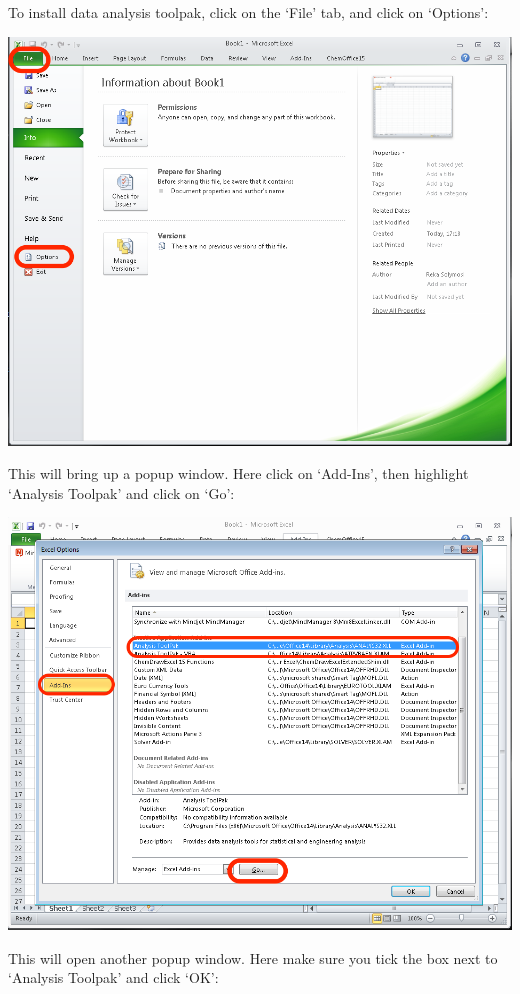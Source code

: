 \documentclass[
]{book}
\begin{document}
To install data analysis toolpak, click on the `File' tab, and click on `Options':

\includegraphics{imgs/file_tab_options.png}

This will bring up a popup window. Here click on `Add-Ins', then highlight `Analysis Toolpak' and click on `Go':

\includegraphics{imgs/install_analysis_toolpak.png}

This will open another popup window. Here make sure you tick the box next to `Analysis Toolpak' and click `OK':
\end{document}

